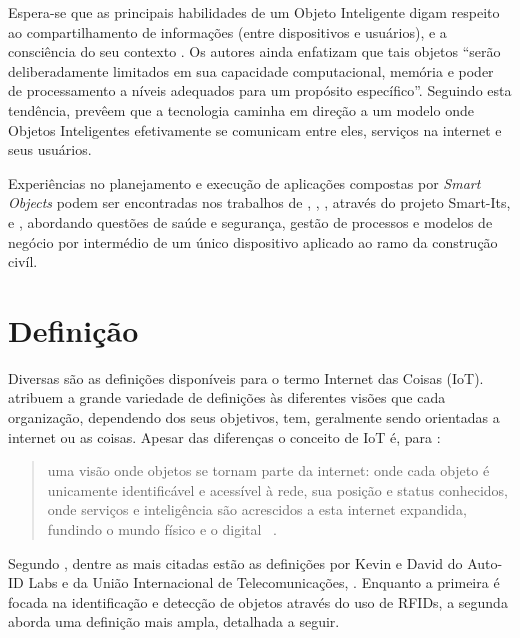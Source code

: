 \documentclass[twoside,english,brazilian]{UNISINOSmonografia}
\begin{document}
	Espera-se que as principais habilidades de um Objeto Inteligente digam 
	respeito ao compartilhamento de informações (entre dispositivos e 
	usuários), e a consciência do seu contexto \cite{Gellersen2001}. 
	Os autores ainda enfatizam que tais objetos ``serão deliberadamente 
	limitados em sua capacidade computacional, memória e poder de 
	processamento a níveis adequados para um propósito específico''. 
	Seguindo esta tendência,  prevêem que a tecnologia 
	caminha em direção a um modelo onde Objetos Inteligentes efetivamente se 
	comunicam entre eles, serviços na internet e seus usuários.
	
	Experiências no planejamento e execução de aplicações compostas por 
	\textit{Smart Objects} podem ser encontradas nos trabalhos de 
	, , 
	, através do projeto Smart-Its, e 
	, abordando questões de saúde e segurança, gestão 
	de processos e modelos de negócio por intermédio de um único dispositivo 
	aplicado ao ramo da construção civíl.

\section{Definição}

	Diversas são as definições disponíveis para o termo Internet das 
	Coisas (IoT).  atribuem a grande variedade de 
	definições às diferentes visões que cada organização, dependendo dos 
	seus objetivos, tem, geralmente sendo orientadas a internet ou as 
	coisas. Apesar das diferenças o conceito de IoT é, para 
	:
	
	\begin{quote}
		uma visão onde objetos se tornam parte da internet: onde cada 
		objeto é unicamente identificável e acessível à rede, sua posição 
		e status conhecidos, onde serviços e inteligência são acrescidos a 
		esta internet expandida, fundindo o mundo físico e o digital~
		\cite{Coetzee2011}.
	\end{quote}
	
	Segundo , dentre as mais citadas estão as 
	definições por Kevin  e David 
	 do Auto-ID Labs e da União Internacional de 
	Telecomunicações, . Enquanto a primeira é focada na 
	identificação e detecção de objetos através do uso de RFIDs, a segunda 
	aborda uma definição mais ampla, detalhada a seguir.
	
\end{document}
